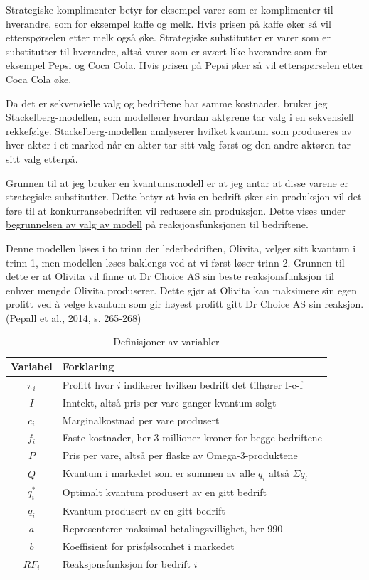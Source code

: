 \documentclass[
  12pt,
  a4paper,
  DIV=11,
  numbers=noendperiod]{scrartcl}
\begin{document}
Strategiske komplimenter betyr for eksempel varer som er komplimenter
til hverandre, som for eksempel kaffe og melk. Hvis prisen på kaffe øker
så vil etterspørselen etter melk også øke. Strategiske substitutter er
varer som er substitutter til hverandre, altså varer som er svært like
hverandre som for eksempel Pepsi og Coca Cola. Hvis prisen på Pepsi øker
så vil etterspørselen etter Coca Cola øke.

Da det er sekvensielle valg og bedriftene har samme kostnader, bruker
jeg Stackelberg-modellen, som modellerer hvordan aktørene tar valg i en
sekvensiell rekkefølge. Stackelberg-modellen analyserer hvilket kvantum
som produseres av hver aktør i et marked når en aktør tar sitt valg
først og den andre aktøren tar sitt valg etterpå.

Grunnen til at jeg bruker en kvantumsmodell er at jeg antar at disse
varene er strategiske substitutter. Dette betyr at hvis en bedrift øker
sin produksjon vil det føre til at konkurransebedriften vil redusere sin
produksjon. Dette vises under
\hyperlink{begrunnelse}{begrunnelsen av valg av modell} på
reaksjonsfunksjonen til bedriftene.

Denne modellen løses i to trinn der lederbedriften, Olivita, velger sitt
kvantum i trinn 1, men modellen løses baklengs ved at vi først løser
trinn 2. Grunnen til dette er at Olivita vil finne ut Dr Choice AS sin
beste reaksjonsfunksjon til enhver mengde Olivita produserer. Dette gjør
at Olivita kan maksimere sin egen profitt ved å velge kvantum som gir
høyest profitt gitt Dr Choice AS sin reaksjon. (Pepall et al., 2014, s.
265-268)

\newpage

\begin{table}[t]
\centering
\begin{tabular}{|c|l|}
\hline
\textbf{Variabel} & \textbf{Forklaring} \\
\hline
$\pi_i$ & Profitt hvor $i$ indikerer hvilken bedrift det tilhører I-c-f \\
$I$ & Inntekt, altså pris per vare ganger kvantum solgt \\
$c_i$ & Marginalkostnad per vare produsert \\
$f_i$ & Faste kostnader, her 3 millioner kroner for begge bedriftene \\
$P$ & Pris per vare, altså per flaske av Omega-3-produktene \\
$Q$ & Kvantum i markedet som er summen av alle $q_i$ altså $\Sigma q_i$ \\
$q_i^*$ & Optimalt kvantum produsert av en gitt bedrift \\
$q_i$ & Kvantum produsert av en gitt bedrift \\
$a$ & Representerer maksimal betalingsvillighet, her 990 \\
$b$ & Koeffisient for prisfølsomhet i markedet \\
$RF_i$ & Reaksjonsfunksjon for bedrift $i$ \\
\hline
\end{tabular}
\caption{Definisjoner av variabler}
\label{tab:definitions}
\end{table}
\end{document}

